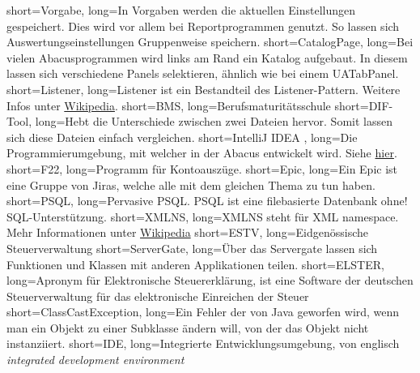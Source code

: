  {
	short=Vorgabe,
	long={In Vorgaben werden die aktuellen Einstellungen gespeichert. Dies wird vor allem bei Reportprogrammen genutzt. So lassen sich Auswertungseinstellungen Gruppenweise speichern.}
}
 {
	short=CatalogPage,
	long={Bei vielen Abacusprogrammen wird links am Rand ein Katalog aufgebaut. In diesem lassen sich verschiedene Panels selektieren, ähnlich wie bei einem UATabPanel.}
}
 {
	short=Listener,
	long={Listener ist ein Bestandteil des Listener-Pattern. Weitere Infos unter \href{https://de.wikipedia.org/wiki/Beobachter_(Entwurfsmuster)}{Wikipedia}.}
}
 {
	short=BMS,
	long={Berufsmaturitätsschule}
}
 {
	short=DIF-Tool,
	long={Hebt die Unterschiede zwischen zwei Dateien hervor. Somit lassen sich diese Dateien einfach vergleichen.}
}
 {
	short=IntelliJ IDEA ,
	long={Die Programmierumgebung, mit welcher in der Abacus entwickelt wird. Siehe \href{https://www.jetbrains.com/idea/}{hier}.}
}
 {
	short=F22,
	long={Programm für Kontoauszüge.}
}
 {
	short=Epic,
	long={Ein Epic ist eine Gruppe von Jiras, welche alle mit dem gleichen Thema zu tun haben.}
}
 {
	short=PSQL,
	long={Pervasive PSQL. PSQL ist eine filebasierte Datenbank ohne! SQL-Unterstützung.}
}
 {
	short=XMLNS,
	long={XMLNS steht für XML namespace. Mehr Informationen unter \href{https://de.wikipedia.org/wiki/Namensraum_(XML)}{Wikipedia}}
}
 {
	short=ESTV,
	long={Eidgenössische Steuerverwaltung}
}
 {
	short=ServerGate,
	long={Über das Servergate lassen sich Funktionen und Klassen mit anderen Applikationen teilen.}
}
 {
	short=ELSTER,
	long={Apronym für Elektronische Steuererklärung, ist eine Software der deutschen Steuerverwaltung für das elektronische Einreichen der Steuer}
}
 {
	short=ClassCastException,
	long={Ein Fehler der von Java geworfen wird, wenn man ein Objekt zu einer Subklasse ändern will, von der das Objekt nicht instanziiert.}
}
 {
	short=IDE,
	long={Integrierte Entwicklungsumgebung, von englisch \textit{integrated development environment}}
}